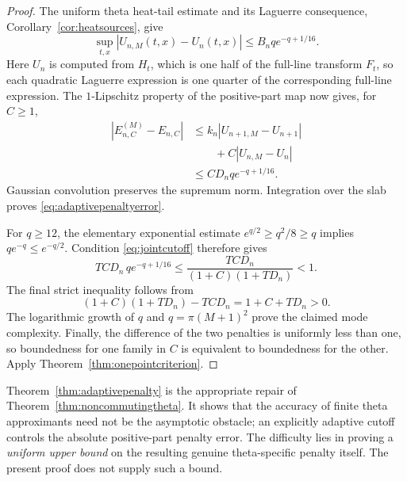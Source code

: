 \begin{proof}
The uniform theta heat-tail estimate
and its Laguerre consequence,
Corollary~\ref{cor:heatsources},
give
\[
\sup_{t,x}
|U_{n,M}(t,x)-U_n(t,x)|
\le B_n q e^{-q+1/16}.
\]
Here $U_n$ is computed from $H_t$,
which is one half of the full-line
transform $F_t$, so each
quadratic Laguerre expression is
one quarter of the corresponding
full-line expression. The
$1$-Lipschitz property of the
positive-part map now gives, for
$C\ge1$,
\begin{align*}
|E^{(M)}_{n,C}-E_{n,C}|
&\le k_n|U_{n+1,M}-U_{n+1}|\\
&\qquad+C|U_{n,M}-U_n|\\
&\le C D_n q e^{-q+1/16}.
\end{align*}
Gaussian convolution preserves the
supremum norm. Integration over
the slab proves
\eqref{eq:adaptivepenaltyerror}.

For $q\ge12$, the elementary
exponential estimate
$e^{q/2}\ge q^2/8\ge q$
implies $q e^{-q}\le e^{-q/2}$.
Condition \eqref{eq:jointcutoff}
therefore gives
\[
TC D_n\,q e^{-q+1/16}
\le\frac{TC D_n}{(1+C)(1+TD_n)}<1.
\]
The final strict inequality follows
from
\[
(1+C)(1+TD_n)-TC D_n
=1+C+TD_n>0.
\]
The logarithmic growth of $q$ and
$q=\pi(M+1)^2$ prove the claimed
mode complexity. Finally, the
difference of the two penalties is
uniformly less than one, so
boundedness for one family in $C$
is equivalent to boundedness
for the other. Apply
Theorem~\ref{thm:onepointcriterion}.
\end{proof}

Theorem~\ref{thm:adaptivepenalty}
is the appropriate repair of
Theorem~\ref{thm:noncommutingtheta}.
It shows that the accuracy of
finite theta approximants need
not be the asymptotic obstacle;
an explicitly adaptive
cutoff controls the absolute
positive-part penalty error.
The difficulty lies in proving
a \emph{uniform upper bound} on
the resulting genuine
theta-specific penalty itself.
The present proof does not
supply such a bound.
